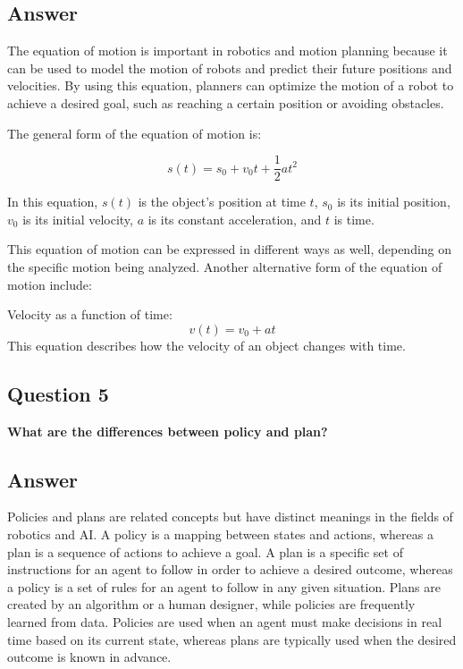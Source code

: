 \documentclass[12]{article}
\begin{document}
\subsection*{Answer}


 The equation of motion is important in robotics and motion planning because it can be used to model the motion of robots and predict their future positions and velocities. By using this equation, planners can optimize the motion of a robot to achieve a desired goal, such as reaching a certain position or avoiding obstacles.

The general form of the equation of motion is:

 \begin{equation}
s(t) = s_0 + v_0t + \frac{1}{2}at^2
\end{equation}

In this equation, $s(t)$ is the object's position at time $t$, $s_0$ is its initial position, $v_0$ is its initial velocity, $a$ is its constant acceleration, and $t$ is time. 

This equation of motion can be expressed in different ways as well, depending on the specific motion being analyzed. Another alternative form of the equation of motion include:

Velocity as a function of time: \begin{equation} v(t) = v_0 + at \end{equation} This equation describes how the velocity of an object changes with time.


\subsection*{Question 5}
 \textbf{What are the differences between policy and plan?}
\subsection*{Answer}

Policies and plans are related concepts but have distinct meanings in the fields of robotics and AI. A policy is a mapping between states and actions, whereas a plan is a sequence of actions to achieve a goal. A plan is a specific set of instructions for an agent to follow in order to achieve a desired outcome, whereas a policy is a set of rules for an agent to follow in any given situation. Plans are created by an algorithm or a human designer, while policies are frequently learned from data. Policies are used when an agent must make decisions in real time based on its current state, whereas plans are typically used when the desired outcome is known in advance.
\end{document}
